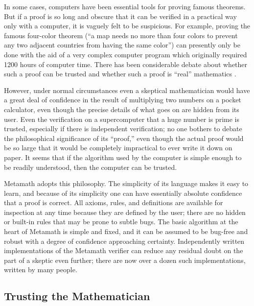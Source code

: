 In some cases, computers have been essential tools for proving famous
theorems.  But if a proof is so long and obscure that it can be verified in a
practical way only with a computer, it is vaguely felt to be suspicious.  For
example, proving the famous four-color theorem (``a map needs no more than four colors to
prevent any two adjacent countries from having the same color'') can presently
only be done with the aid of a very complex computer program which originally
required 1200 hours of computer time. There has been considerable debate about
whether such a proof can be trusted and whether such a proof is ``real''
mathematics \cite{Swart}.

However, under normal circumstances even a skeptical mathematician would have a
great deal of confidence in the result of multiplying two numbers on a pocket
calculator, even though the precise details of what goes on are hidden from its
user.  Even the verification on a supercomputer that a huge number is prime is
trusted, especially if there is independent verification; no one bothers to
debate the philosophical significance of its ``proof,'' even though the actual
proof would be so large that it would be completely impractical to ever write
it down on paper.  It seems that if the algorithm used by the computer is
simple enough to be readily understood, then the computer can be trusted.

Metamath adopts this philosophy.  The simplicity of its
language makes it easy to learn, and because of its simplicity one can have
essentially absolute confidence that a proof is correct. All axioms, rules, and
definitions are available for inspection at any time because they are defined
by the user; there are no hidden or built-in rules that may be prone to subtle
bugs.  The basic algorithm at the heart of
Metamath is simple and fixed, and it can be assumed to be bug-free and robust
with a degree of confidence approaching certainty.
Independently written implementations of the Metamath verifier
can reduce any residual doubt on the part of a skeptic even further;
there are now over a dozen such implementations, written by many people.

\subsection{Trusting the Mathematician}\label{trust}

